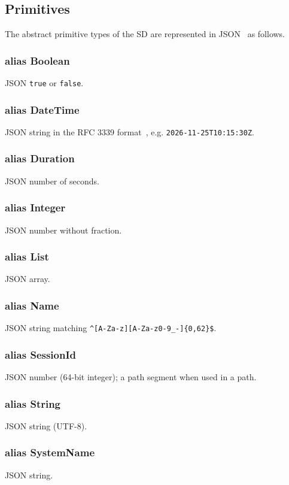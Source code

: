 \documentclass[a4paper]{arrowhead}
\newcommand{\pdef}[1]{{\textcolor{ArrowheadGrey}{#1\label{sec:model:primitives:#1}\label{sec:model:primitives:#1s}}}}
\begin{document}
\subsection{Primitives}
\label{sec:model:primitives}
The abstract primitive types of the SD are represented in JSON~\cite{rfc8259} as follows.
\subsubsection*{alias \pdef{Boolean}}
JSON \texttt{true} or \texttt{false}.

\subsubsection*{alias \pdef{DateTime}}
JSON string in the RFC 3339 format~\cite{rfc3339}, e.g. \texttt{2026-\allowbreak{}11-\allowbreak{}25T10:15:30Z}.

\subsubsection*{alias \pdef{Duration}}
JSON number of seconds.

\subsubsection*{alias \pdef{Integer}}
JSON number without fraction.

\subsubsection*{alias \pdef{List}}
JSON array.

\subsubsection*{alias \pdef{Name}}
JSON string matching \texttt{\^{}[A-Za-z][A-Za-z0-9\_-]\{0,62\}\$}.

\subsubsection*{alias \pdef{SessionId}}
JSON number (64-bit integer); a path segment when used in a path.

\subsubsection*{alias \pdef{String}}
JSON string (UTF-8).

\subsubsection*{alias \pdef{SystemName}}
JSON string.
\end{document}
